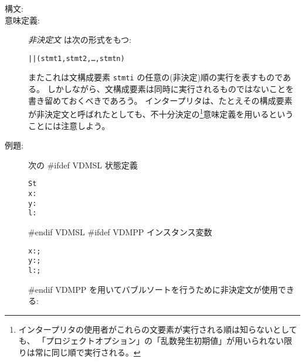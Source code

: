 \documentclass[\pformat,12pt]{jarticle}
\begin{document}
\begin{description}
\item[構文:]
  

\item[意味定義:]  {\it 非決定文} は次の形式をもつ:
  \begin{alltt}
    || (stmt1, stmt2, \ldots, stmtn)
  \end{alltt}
またこれは文構成要素 {\tt  stmti} の任意の(非決定)順の実行を表すものである。
しかしながら、文構成要素は同時に実行されるものではないことを書き留めておくべきであろう。
インタープリタは、たとえその構成要素が非決定文と呼ばれたとしても、不十分決定の\footnote{インタープリタの使用者がこれらの文要素が実行される順は知らないとしても、 「プロジェクトオプション」の「乱数発生初期値」が用いられない限りは常に同じ順で実行される。}意味定義を用いるということには注意しよう。

\item[例題:] 次の
#ifdef VDMSL
状態定義
  \begin{alltt}
   St 
    x:
    y:
    l:
  \end{alltt}
#endif VDMSL
#ifdef VDMPP
インスタンス変数
  \begin{alltt}
    x:;
    y:;
    l:;
  \end{alltt}
#endif VDMPP
を用いてバブルソートを行うために非決定文が使用できる:


\end{description}
\end{document}
